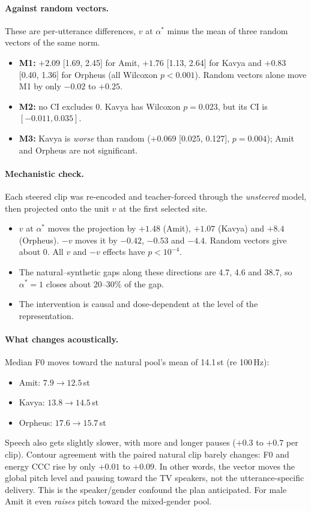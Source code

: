\documentclass[11pt]{article}
\newcommand{\astar}{\alpha^{*}}
\begin{document}
\paragraph{Against random vectors.}
These are per-utterance differences, $v$ at $\astar$ minus the mean of three random vectors of the same norm.
\begin{itemize}
\item \textbf{M1:} $+2.09$ [1.69, 2.45] for Amit, $+1.76$ [1.13, 2.64] for Kavya and $+0.83$ [0.40, 1.36] for Orpheus (all Wilcoxon $p<0.001$). Random vectors alone move M1 by only $-0.02$ to $+0.25$.
\item \textbf{M2:} no CI excludes 0. Kavya has Wilcoxon $p=0.023$, but its CI is $[-0.011, 0.035]$.
\item \textbf{M3:} Kavya is \emph{worse} than random ($+0.069$ [0.025, 0.127], $p=0.004$); Amit and Orpheus are not significant.
\end{itemize}

\paragraph{Mechanistic check.}
Each steered clip was re-encoded and teacher-forced through the \emph{unsteered} model, then projected onto the unit $v$ at the first selected site.
\begin{itemize}
\item $v$ at $\astar$ moves the projection by $+1.48$ (Amit), $+1.07$ (Kavya) and $+8.4$ (Orpheus). $-v$ moves it by $-0.42$, $-0.53$ and $-4.4$. Random vectors give about 0. All $v$ and $-v$ effects have $p<10^{-4}$.
\item The natural--synthetic gaps along these directions are 4.7, 4.6 and 38.7, so $\astar=1$ closes about 20--30\% of the gap.
\item The intervention is causal and dose-dependent at the level of the representation.
\end{itemize}

\paragraph{What changes acoustically.}
Median F0 moves toward the natural pool's mean of 14.1\,st (re 100\,Hz):
\begin{itemize}
\item Amit: $7.9\to12.5$\,st
\item Kavya: $13.8\to14.5$\,st
\item Orpheus: $17.6\to15.7$\,st
\end{itemize}
Speech also gets slightly slower, with more and longer pauses ($+0.3$ to $+0.7$ per clip). Contour agreement with the paired natural clip barely changes: F0 and energy CCC rise by only $+0.01$ to $+0.09$. In other words, the vector moves the global pitch level and pausing toward the TV speakers, not the utterance-specific delivery. This is the speaker/gender confound the plan anticipated. For male Amit it even \emph{raises} pitch toward the mixed-gender pool.
\end{document}
